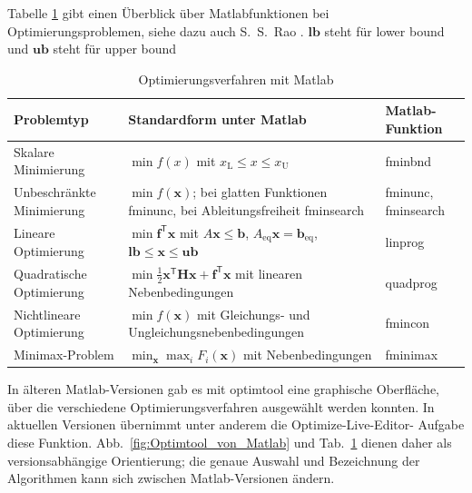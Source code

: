 \newpage
Tabelle \ref*{tab:Optimierungsverfahren} gibt einen Überblick über
Matlabfunktionen bei Optimierungsproblemen, siehe dazu auch
S.~S.~Rao \cite{Rao09}. $\mathbf{lb}$ steht für \glq lower bound\grq~ und $\mathbf{ub}$ steht für \glq upper bound\grq~

\begin{table}[!ht]
	\caption{Optimierungsverfahren mit Matlab}
	\centering
\begin{tabular}{p{4.5cm}|p{7.2cm}|p{3.0cm}}
\hline
Problemtyp & Standardform unter Matlab & Matlab-Funktion \\[1ex]
\hline\hline
Skalare Minimierung &
$\min f(x)$ mit $x_\mathrm{L}\leq x\leq x_\mathrm{U}$ &
\textsf{fminbnd} \\[1ex]\hline
Unbeschränkte Minimierung &
$\min f(\mathbf{x})$; bei glatten Funktionen \textsf{fminunc},
bei Ableitungsfreiheit \textsf{fminsearch} &
\textsf{fminunc}, \textsf{fminsearch} \\[1ex]\hline
Lineare Optimierung &
$\min \mathbf{f}^{\mathsf T}\mathbf{x}$ mit
$A\mathbf{x}\leq\mathbf{b}$, $A_\mathrm{eq}\mathbf{x}=\mathbf{b}_\mathrm{eq}$,
$\mathbf{lb}\leq\mathbf{x}\leq\mathbf{ub}$ &
\textsf{linprog} \\[1ex]\hline
Quadratische Optimierung &
$\min \frac{1}{2}\mathbf{x}^{\mathsf T}\mathbf{H}\mathbf{x}
+\mathbf{f}^{\mathsf T}\mathbf{x}$ mit linearen Nebenbedingungen &
\textsf{quadprog} \\[1ex]\hline
Nichtlineare Optimierung &
$\min f(\mathbf{x})$ mit Gleichungs- und Ungleichungsnebenbedingungen &
\textsf{fmincon} \\[1ex]\hline
Minimax-Problem &
$\min_{\mathbf{x}}\max_i F_i(\mathbf{x})$ mit Nebenbedingungen &
\textsf{fminimax} \\[1ex]\hline
\end{tabular}
	\label{tab:Optimierungsverfahren}
\end{table}

In älteren Matlab-Versionen gab es mit \textsf{optimtool} eine graphische
Oberfläche, über die verschiedene Optimierungsverfahren ausgewählt werden
konnten. In aktuellen Versionen übernimmt unter anderem die Optimize-Live-Editor-
Aufgabe diese Funktion. Abb.~\ref{fig:Optimtool_von_Matlab} und
Tab.~\ref*{tab:Optimierungsverfahren} dienen daher als versionsabhängige
Orientierung; die genaue Auswahl und Bezeichnung der Algorithmen kann sich
zwischen Matlab-Versionen ändern.

